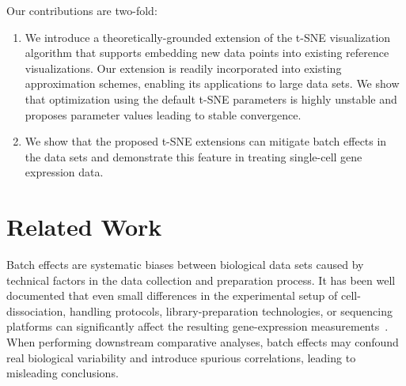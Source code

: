 \documentclass[runningheads]{llncs}
\begin{document}
Our contributions are two-fold: 
\begin{enumerate}
  \item We introduce a theoretically-grounded extension of the t-SNE
   visualization algorithm that supports embedding new data points into
   existing reference visualizations. Our extension is readily incorporated
   into existing approximation schemes, enabling its applications to large
   data sets. We show that optimization using the default t-SNE parameters is
   highly unstable and proposes parameter values leading to stable
   convergence.

  \item We show that the proposed t-SNE extensions can mitigate batch effects
   in the data sets and demonstrate this feature in treating single-cell gene
   expression data.
\end{enumerate}


\section{Related Work}

Batch effects are systematic biases between biological data sets caused by
technical factors in the data collection and preparation process. It has been
well documented that even small differences in the experimental setup of
cell-dissociation, handling protocols, library-preparation technologies, or
sequencing platforms can significantly affect the resulting gene-expression
measurements~\cite{Tung2017,Hicks2018}. When performing downstream
comparative analyses, batch effects may confound real biological variability
and introduce spurious correlations, leading to misleading conclusions.
\end{document}
